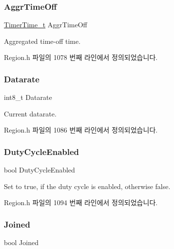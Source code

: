 \subsubsection{\texorpdfstring{Aggr\+Time\+Off}{AggrTimeOff}}
{\footnotesize\ttfamily \mbox{\hyperlink{utilities_8h_a4215ca43d3e953099ea758ce428599d0}{Timer\+Time\+\_\+t}} Aggr\+Time\+Off}

Aggregated time-\/off time. 

Region.\+h 파일의 1078 번째 라인에서 정의되었습니다.

\mbox{\label{structs_next_chan_params_ae2f6080f3aa0e9485c55513ca56bb24d}} 
\subsubsection{\texorpdfstring{Datarate}{Datarate}}
{\footnotesize\ttfamily int8\+\_\+t Datarate}

Current datarate. 

Region.\+h 파일의 1086 번째 라인에서 정의되었습니다.

\mbox{\label{structs_next_chan_params_a4d755868e0e80089462286c3ba6a6f18}} 
\subsubsection{\texorpdfstring{Duty\+Cycle\+Enabled}{DutyCycleEnabled}}
{\footnotesize\ttfamily bool Duty\+Cycle\+Enabled}

Set to true, if the duty cycle is enabled, otherwise false. 

Region.\+h 파일의 1094 번째 라인에서 정의되었습니다.

\mbox{\label{structs_next_chan_params_ac2f6caa0f3b02d2ac5056c3ee7c22652}} 
\subsubsection{\texorpdfstring{Joined}{Joined}}
{\footnotesize\ttfamily bool Joined}


